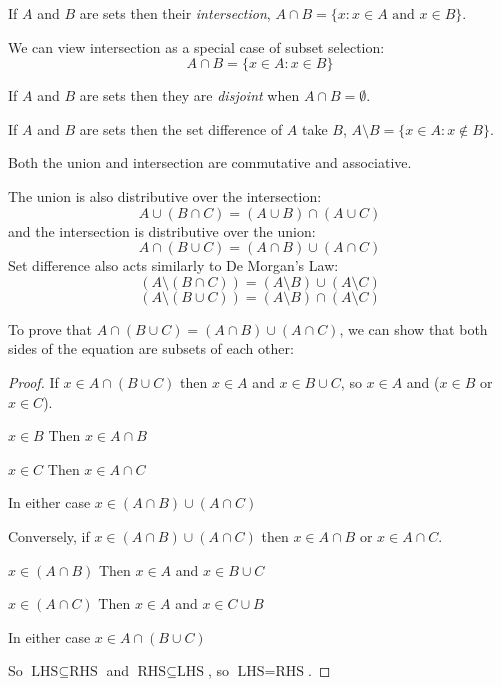 \documentclass[../main.tex]{subfiles}
\begin{document}
\begin{definition}[Intersection]
  If $A$ and $B$ are sets then their \textit{intersection}, $A \cap B = \{x: x \in A \text{ and } x \in B\}$.
\end{definition}
\begin{remark}[Remark]
  We can view intersection as a special case of subset selection:
  \[
    A \cap B = \{x \in A : x \in B\}
  \]
\end{remark}
\begin{definition}[Disjoint]
  If $A$ and $B$ are sets then they are \textit{disjoint} when $A \cap B = \emptyset$.
\end{definition}
\begin{definition}
  If $A$ and $B$ are sets then the set difference of $A$ take $B$, $A \setminus B = \{x \in A: x \notin B\}$. 
\end{definition}
\begin{remark}[Note]
  Both the union and intersection are commutative and associative.

  The union is also distributive over the intersection:
  \[
    A \cup (B \cap C) = (A \cup B) \cap (A \cup C)
  \]
  and the intersection is distributive over the union:
  \[
    A \cap (B \cup C) = (A \cap B) \cup (A \cap C)
  \]
  Set difference also acts similarly to De Morgan's Law:
  \[
    (A \setminus (B \cap C)) = (A \setminus B) \cup (A \setminus C)
  \]
  \[
    (A \setminus (B \cup C)) = (A \setminus B) \cap (A \setminus C)
  \]
\end{remark}
To prove that $A \cap (B \cup C) = (A \cap B) \cup (A \cap C)$, we can show that both sides of the equation are subsets of each other:
\begin{proof}\par
  If $x \in A \cap (B \cup C)$ then $x \in A$ and $x \in B \cup C$, so $x \in A$ and ($x \in B$ or $x \in C$).
  \begin{proofcases}
    \begin{case}{$x \in B$}
      Then $x \in A \cap B$
    \end{case}
    \begin{case}{$x \in C$}
      Then $x \in A \cap C$
    \end{case}
  \end{proofcases}
  In either case $x \in (A \cap B) \cup (A \cap C)$

  Conversely, if $x \in (A \cap B) \cup (A \cap C)$ then $x \in A \cap B$ or $x \in A \cap C$.
  \begin{proofcases}
    \begin{case}{$x \in (A \cap B)$}
      Then $x \in A$ and $x \in B \cup C$
    \end{case}
    \begin{case}{$x \in (A \cap C)$}
      Then $x \in A$ and $x \in C \cup B$
    \end{case}
  \end{proofcases}
  In either case $x \in A \cap (B \cup C)$

  So $\text{LHS} \subseteq \text{RHS}$ and $\text{RHS} \subseteq \text{LHS}$, so $\text{LHS} = \text{RHS}$.
\end{proof}
\end{document}
